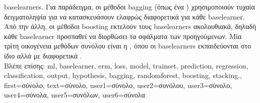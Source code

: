 {{		\glspl{baselearner}. \foreignlanguage{greek}{Για παράδειγμα, οι μέθοδοι} \gls{bagging} (\foreignlanguage{greek}{όπως ένα} 
		) \foreignlanguage{greek}{χρησιμοποιούν τυχαία δειγματοληψία για να κατασκευάσουν ελαφρώς 
		διαφορετικά}  \foreignlanguage{greek}{για κάθε} \gls{baselearner}. \foreignlanguage{greek}{Από την
		άλλη, οι μέθοδοι} \gls{boosting} \foreignlanguage{greek}{εκτελούν τους} \glspl{baselearner} \foreignlanguage{greek}{ακολουθιακά,
		δηλαδή κάθε} \gls{baselearner} \foreignlanguage{greek}{προσπαθεί να διορθώσει τα σφάλματα}  
		\foreignlanguage{greek}{των προηγούμενων. Μία τρίτη οικογένεια μεθόδων συνόλου είναι η} , 
		\foreignlanguage{greek}{όπου οι} \glspl{baselearner} \foreignlanguage{greek}{εκπαιδεύονται στο ίδιο}  
		\foreignlanguage{greek}{αλλά με διαφορετικά} .
		\\
	 	\foreignlanguage{greek}{Βλέπε επίσης:} \gls{ml}, \gls{baselearner}, \gls{erm}, \gls{loss}, \gls{model}, \gls{trainset}, \gls{prediction}, 
		\gls{regression}, \gls{classification}, \gls{output}, \gls{hypothesis}, \gls{bagging}, \gls{randomforest}, \gls{boosting}, \gls{stacking}.},
	first={\foreignlanguage{greek}{σύνολο}},
	text={\foreignlanguage{greek}{σύνολο}},
 	user1={\foreignlanguage{greek}{σύνολο}}, %
 	user2={\foreignlanguage{greek}{συνόλου}}, %
 	user3={\foreignlanguage{greek}{σύνολο}}, %
 	user4={\foreignlanguage{greek}{σύνολα}}, %
	user5={\foreignlanguage{greek}{συνόλων}}, %
 	user6={\foreignlanguage{greek}{σύνολα}} %
}

